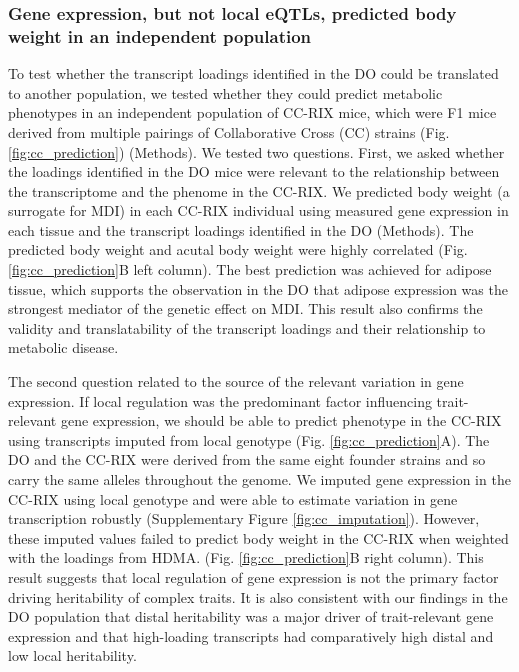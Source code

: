 \documentclass[
]{article}
\begin{document}
\subsubsection{Gene expression, but not local eQTLs, predicted body
weight in an independent
population}\label{gene-expression-but-not-local-eqtls-predicted-body-weight-in-an-independent-population}

To test whether the transcript loadings identified in the DO could be
translated to another population, we tested whether they could predict
metabolic phenotypes in an independent population of CC-RIX mice, which
were F1 mice derived from multiple pairings of Collaborative Cross (CC)
\cite{pmid28592495, pmid21411855, 
pmid17674098, pmid15514660} strains (Fig. \ref{fig:cc_prediction})
(Methods). We tested two questions. First, we asked whether the loadings
identified in the DO mice were relevant to the relationship between the
transcriptome and the phenome in the CC-RIX. We predicted body weight (a
surrogate for MDI) in each CC-RIX individual using measured gene
expression in each tissue and the transcript loadings identified in the
DO (Methods). The predicted body weight and acutal body weight were
highly correlated (Fig. \ref{fig:cc_prediction}B left column). The best
prediction was achieved for adipose tissue, which supports the
observation in the DO that adipose expression was the strongest mediator
of the genetic effect on MDI. This result also confirms the validity and
translatability of the transcript loadings and their relationship to
metabolic disease.

The second question related to the source of the relevant variation in
gene expression. If local regulation was the predominant factor
influencing trait-relevant gene expression, we should be able to predict
phenotype in the CC-RIX using transcripts imputed from local genotype
(Fig. \ref{fig:cc_prediction}A). The DO and the CC-RIX were derived from
the same eight founder strains and so carry the same alleles throughout
the genome. We imputed gene expression in the CC-RIX using local
genotype and were able to estimate variation in gene transcription
robustly (Supplementary Figure \ref{fig:cc_imputation}). However, these
imputed values failed to predict body weight in the CC-RIX when weighted
with the loadings from HDMA. (Fig. \ref{fig:cc_prediction}B right
column). This result suggests that local regulation of gene expression
is not the primary factor driving heritability of complex traits. It is
also consistent with our findings in the DO population that distal
heritability was a major driver of trait-relevant gene expression and
that high-loading transcripts had comparatively high distal and low
local heritability.
\end{document}
